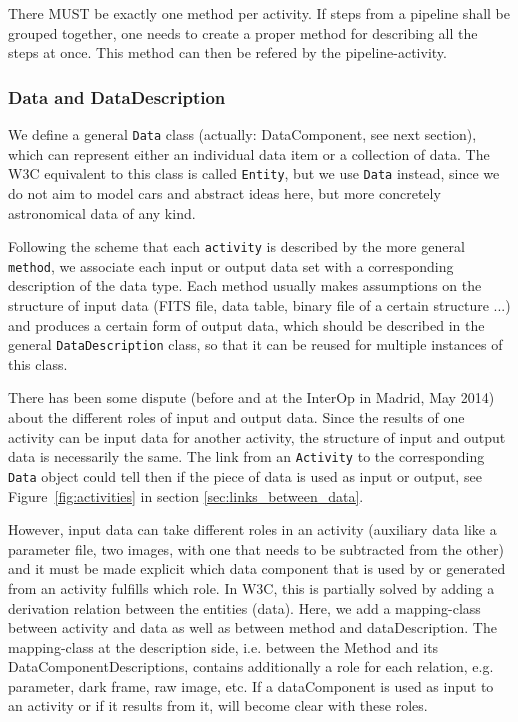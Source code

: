 \documentclass[11pt,a4paper]{ivoa}
\begin{document}
There MUST be exactly one method per activity. If steps from a pipeline shall be 
grouped together, one needs to create a proper method for describing all 
the steps at once. This method can then be refered by the pipeline-activity. 

\subsubsection{Data and DataDescription}
We define a general \texttt{Data} class (actually: DataComponent, see next section), 
which can represent either an individual data item or a collection of data. The W3C equivalent to this class is called \texttt{Entity}, but we use \texttt{Data} instead, since we do not aim to model cars and abstract ideas here, but more concretely astronomical data of any kind. 

Following the scheme that each \texttt{activity} is described
by the more general \texttt{method}, we associate each input or
output data set with a corresponding description of the data type. Each method
usually makes assumptions on the structure of input data (FITS file, data
table, binary file of a certain structure ...) and produces a certain form of
output data, which should be described in the general \texttt{DataDescription}
class, so that it can be reused for multiple instances of this class.


There has been some dispute (before and at the InterOp in Madrid, May 2014) about the different roles of input and output data. Since the results of one activity can be input data for
another activity, the structure of input and output data is necessarily the same.
The link from an \texttt{Activity} to the corresponding \texttt{Data}
object could tell then if the piece of data is used as input or output, see Figure~\ref{fig:activities} in section \ref{sec:links_between_data}.

However, input data can take different roles in an activity (auxiliary data like a parameter file, two images, with one that needs to be subtracted from the other) and it must be made explicit which data component that is used by or generated from an activity fulfills which role. In W3C, this is partially solved by adding a derivation relation between the entities (data). Here, we add a mapping-class between activity and data as well as between method and dataDescription. The mapping-class at the description side, i.e. between the Method and its DataComponentDescriptions, contains additionally a role for each relation, e.g. parameter, dark frame, raw image, etc.  If a dataComponent is used as input to an activity or if it results from it, will become clear with these roles.
\end{document}
